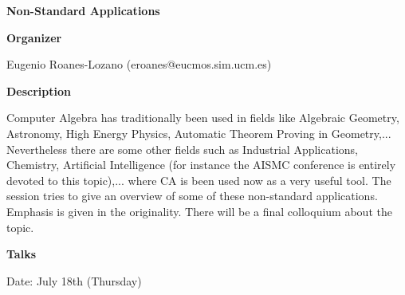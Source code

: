 \begin{center}
{\LARGE \bf Non-Standard Applications
}
\end{center}
\bigskip

\noindent
{\bf Organizer}

\medskip

Eugenio Roanes-Lozano (eroanes@eucmos.sim.ucm.es)

\bigskip

\noindent
{\bf Description}
\medskip

Computer Algebra has traditionally been used in fields like Algebraic Geometry, Astronomy,
High Energy Physics, Automatic Theorem Proving in Geometry,... Nevertheless there are some
other fields such as Industrial Applications, Chemistry, Artificial Intelligence (for instance the
AISMC conference is entirely devoted to this topic),... where CA is been used now as a very useful
tool. The session tries to give an overview of some of these non-standard applications. Emphasis is
given in the originality. There will be a final colloquium about the topic. 

\bigskip
\noindent
{\bf Talks}
\medskip

Date: July 18th (Thursday) 


